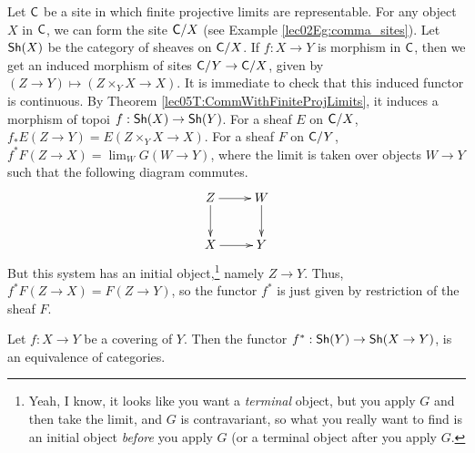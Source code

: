 Let $\text{\sf C}$ be a site in which finite projective limits are representable. For any object
 $X$ in $\text{\sf C}$, we can form the site $\text{\sf C}/X$ (see Example \ref{lec02Eg:comma_sites}). Let
 $\text{\sf Sh}(X)$ be the category of sheaves on $\text{\sf C}/X$. If $f:X\to Y$ is morphism in $\text{\sf C}$, then
 we get an induced morphism of sites $\text{\sf C}/Y\to \text{\sf C}/X$, given by $(Z\to Y)\mapsto (Z\times_Y
 X\to X)$. It is immediate to check that this induced functor is continuous. By Theorem
 \ref{lec05T:CommWithFiniteProjLimits}, it induces a morphism of topoi $f:\text{\sf Sh}(X)\to
 \text{\sf Sh}(Y)$. For a sheaf $E$ on $\text{\sf C}/X$, $f_*E(Z\to Y)=E(Z\times_Y X\to X)$. For a sheaf $F$
 on $\text{\sf C}/Y$, $f^*F(Z\to X)=\lim_W G(W\to Y)$, where the limit is taken over objects $W\to
 Y$ such that the following diagram commutes.
 \[\xymatrix{
    Z\ar[r]\ar[d] & W\ar[d]\\
    X\ar[r] & Y
 }\]
  But this system has an initial object,\footnote{Yeah, I know, it looks like you want a
 \emph{terminal} object, but you apply $G$ and then take the limit, and $G$ is
 contravariant, so what you really want to find is an initial object \emph{before} you
 apply $G$ (or a terminal object after you apply $G$.} namely $Z\to Y$. Thus, $f^*F(Z\to
 X) = F(Z\to Y)$, so the functor $f^*$ is just given by restriction of the sheaf $F$.
 \begin{theorem}\label{lec07T:descent_of_sheaves}
   Let $f:X\to Y$ be a covering of $Y$. Then the functor $f^*:\text{\sf Sh}(Y)\to \text{\sf Sh}(X\to Y)$, is
   an equivalence of categories.
 \end{theorem}

